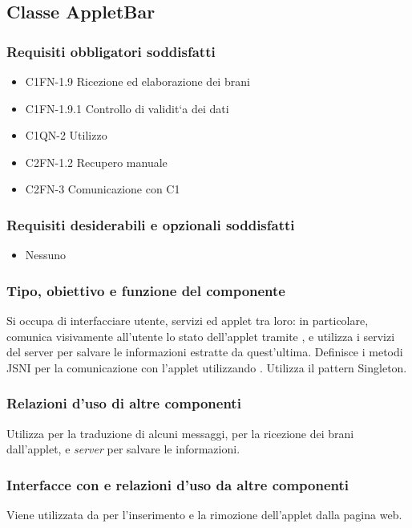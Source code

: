 \subsection{Classe AppletBar}
\subsubsection*{Requisiti obbligatori soddisfatti}
\begin{itemize}
    \item C1FN-1.9 Ricezione ed elaborazione dei brani
    \item C1FN-1.9.1 Controllo di validit`a dei dati
    \item C1QN-2 Utilizzo
    \item C2FN-1.2 Recupero manuale
    \item C2FN-3 Comunicazione con C1
\end{itemize}
\subsubsection*{Requisiti desiderabili e opzionali soddisfatti}
\begin{itemize}
    \item Nessuno
\end{itemize}
\subsubsection*{Tipo, obiettivo e funzione del componente}
Si occupa di interfacciare utente, servizi ed applet tra loro: in particolare,
comunica visivamente all'utente lo stato dell'applet tramite ,
e utilizza i servizi del server per salvare le informazioni estratte da quest'ultima.
Definisce i metodi JSNI per la comunicazione con l'applet utilizzando
. Utilizza il pattern Singleton.
\subsubsection*{Relazioni d'uso di altre componenti}
Utilizza  per la traduzione di alcuni messaggi,
 per la ricezione dei brani dall'applet, e \emph{server} per
salvare le informazioni.
\subsubsection*{Interfacce con e relazioni d'uso da altre componenti}
Viene utilizzata da  per l'inserimento e la rimozione
dell'applet dalla pagina web.
